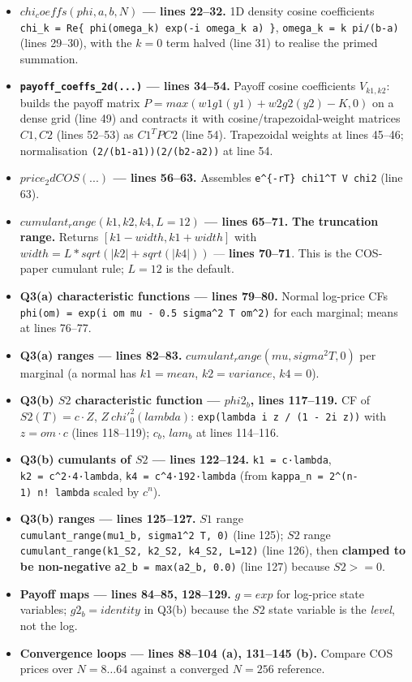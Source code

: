 \documentclass[
  11pt,
]{article}
\providecommand{\tightlist}{%
  \setlength{\itemsep}{0pt}\setlength{\parskip}{0pt}}
\begin{document}
\begin{itemize}
\tightlist
\item
  \textbf{\(chi_coeffs(phi, a, b, N)\) --- lines 22--32.} 1D density
  cosine coefficients
  \texttt{chi\_k\ =\ Re\{\ phi(omega\_k)\ exp(-i\ omega\_k\ a)\ \}},
  \texttt{omega\_k\ =\ k\ pi/(b-a)} (lines 29--30), with the \(k=0\)
  term halved (line 31) to realise the primed summation.
\item
  \textbf{\texttt{payoff\_coeffs\_2d(...)} --- lines 34--54.} Payoff
  cosine coefficients \(V_{k1,k2}\): builds the payoff matrix
  \(P = max(w1 g1(y1) + w2 g2(y2) - K, 0)\) on a dense grid (line 49)
  and contracts it with cosine/trapezoidal-weight matrices \(C1, C2\)
  (lines 52--53) as \(C1^T P C2\) (line 54). Trapezoidal weights at
  lines 45--46; normalisation \texttt{(2/(b1-a1))(2/(b2-a2))} at line
  54.
\item
  \textbf{\(price_2dCOS(...)\) --- lines 56--63.} Assembles
  \texttt{e\^{}\{-rT\}\ chi1\^{}T\ V\ chi2} (line 63).
\item
  \textbf{\(cumulant_range(k1, k2, k4, L=12)\) --- lines 65--71.}
  \textbf{The truncation range.} Returns \([k1 - width, k1 + width]\)
  with \(width = L*sqrt(|k2| + sqrt(|k4|))\) --- \textbf{lines 70--71}.
  This is the COS-paper cumulant rule; \(L=12\) is the default.
\item
  \textbf{Q3(a) characteristic functions --- lines 79--80.} Normal
  log-price CFs
  \texttt{phi(om)\ =\ exp(i\ om\ mu\ -\ 0.5\ sigma\^{}2\ T\ om\^{}2)}
  for each marginal; means at lines 76--77.
\item
  \textbf{Q3(a) ranges --- lines 82--83.}
  \(cumulant_range(mu, sigma^2 T, 0)\) per marginal (a normal has
  \(k1 = mean\), \(k2 = variance\), \(k4 = 0\)).
\item
  \textbf{Q3(b) \(S2\) characteristic function --- \(phi2_b\), lines
  117--119.} CF of \(S2(T) = c·Z\), \(Z ~ chi'^2_0(lambda)\):
  \texttt{exp(lambda\ i\ z\ /\ (1\ -\ 2i\ z))} with \(z = om·c\) (lines
  118--119); \(c_b\), \(lam_b\) at lines 114--116.
\item
  \textbf{Q3(b) cumulants of \(S2\) --- lines 122--124.}
  \texttt{k1\ =\ c·lambda}, \texttt{k2\ =\ c\^{}2·4·lambda},
  \texttt{k4\ =\ c\^{}4·192·lambda} (from
  \texttt{kappa\_n\ =\ 2\^{}(n-1)\ n!\ lambda} scaled by \(c^n\)).
\item
  \textbf{Q3(b) ranges --- lines 125--127.} \(S1\) range
  \texttt{cumulant\_range(mu1\_b,\ sigma1\^{}2\ T,\ 0)} (line 125);
  \(S2\) range \texttt{cumulant\_range(k1\_S2,\ k2\_S2,\ k4\_S2,\ L=12)}
  (line 126), then \textbf{clamped to be non-negative}
  \texttt{a2\_b\ =\ max(a2\_b,\ 0.0)} (line 127) because \(S2 >= 0\).
\item
  \textbf{Payoff maps --- lines 84--85, 128--129.} \(g = exp\) for
  log-price state variables; \(g2_b = identity\) in Q3(b) because the
  \(S2\) state variable is the \emph{level}, not the log.
\item
  \textbf{Convergence loops --- lines 88--104 (a), 131--145 (b).}
  Compare COS prices over \(N = 8 … 64\) against a converged \(N = 256\)
  reference.
\end{itemize}
\end{document}
